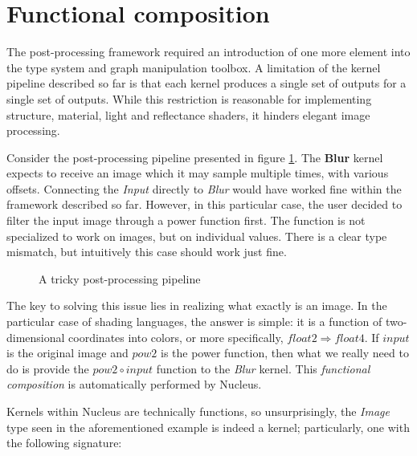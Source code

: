 
\section{Functional composition}
\label{sec:FunctionalComposition}

The post-processing framework required an introduction of one more element into the type system and graph manipulation toolbox. A limitation of the kernel pipeline described so far is that each kernel produces a single set of outputs for a single set of outputs. While this restriction is reasonable for implementing structure, material, light and reflectance shaders, it hinders elegant image processing.

Consider the post-processing pipeline presented in figure \ref{fig:TrickyPostProc}. The \textbf{Blur} kernel expects to receive an image which it may sample multiple times, with various offsets. Connecting the \emph{Input} directly to \emph{Blur} would have worked fine within the framework described so far. However, in this particular case, the user decided to filter the input image through a power function first. The function is not specialized to work on images, but on individual values. There is a clear type mismatch, but intuitively this case should work just fine.

\begin{figure}[h!]
  \centering
    \caption[A tricky post-processing pipeline]{A tricky post-processing pipeline}
  \label{fig:TrickyPostProc}
\end{figure}

The key to solving this issue lies in realizing what exactly is an image. In the particular case of shading languages, the answer is simple: it is a function of two-dimensional coordinates into colors, or more specifically, $float2 \Rightarrow float4$. If $input$ is the original image and $pow2$ is the power function, then what we really need to do is provide the $pow2 \circ input$ function to the \emph{Blur} kernel. This \emph{functional composition} is automatically performed by Nucleus.

Kernels within Nucleus are technically functions, so unsurprisingly, the \emph{Image} type seen in the aforementioned example is indeed a kernel; particularly, one with the following signature:
	

